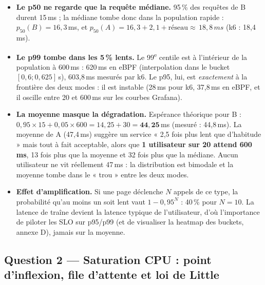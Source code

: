 \documentclass[10pt,a4paper]{article}
\newcommand{\ms}[1]{\,#1\,ms}
\begin{document}
\begin{itemize}
  \item \textbf{Le p50 ne regarde que la requête médiane.} 95\,\% des requêtes de B durent 15\,ms ; la médiane tombe donc dans la population rapide : $p_{50}(B)=16{,}3$\,ms, et $p_{50}(A)=16{,}3+2{,}1+\text{réseau}\approx\ms{18{,}8}$ (k6 : 18,4\,ms).
  \item \textbf{Le p99 tombe dans les 5\,\% lents.} Le 99\textsuperscript{e} centile est à l'intérieur de la population à 600\,ms : 620\,ms en eBPF (interpolation dans le bucket $[0{,}6;0{,}625]$\,s), 603,8\,ms mesurés par k6. Le p95, lui, est \emph{exactement} à la frontière des deux modes : il est instable (28\,ms pour k6, 37,8\,ms en eBPF, et il oscille entre 20 et 600\,ms sur les courbes Grafana).
  \item \textbf{La moyenne masque la dégradation.} Espérance théorique pour B : $0{,}95\times15+0{,}05\times600 = 14{,}25+30 = \mathbf{44{,}25}$\,ms (mesuré : 44,8\,ms). La moyenne de A (47,4\,ms) suggère un service « 2,5 fois plus lent que d'habitude » mais tout à fait acceptable, alors que \textbf{1 utilisateur sur 20 attend 600\,ms}, 13 fois plus que la moyenne et 32 fois plus que la médiane. Aucun utilisateur ne vit réellement 47\,ms : la distribution est bimodale et la moyenne tombe dans le « trou » entre les deux modes.
  \item \textbf{Effet d'amplification.} Si une page déclenche $N$ appels de ce type, la probabilité qu'au moins un soit lent vaut $1-0{,}95^N$ : 40\,\% pour $N=10$. La latence de traîne devient la latence typique de l'utilisateur, d'où l'importance de piloter les SLO sur p95/p99 (et de visualiser la heatmap des buckets, annexe D), jamais sur la moyenne.
\end{itemize}

\subsection*{Question 2 — Saturation CPU : point d'inflexion, file d'attente et loi de Little}
\end{document}
